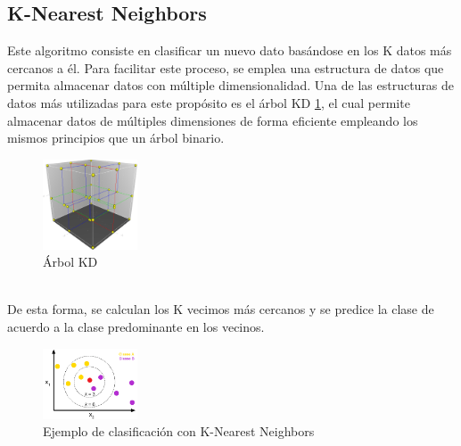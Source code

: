 \documentclass[conference]{IEEEtran}
\begin{document}
\subsection{K-Nearest Neighbors}
Este algoritmo consiste en clasificar un nuevo dato basándose en los K datos más cercanos a él.
Para facilitar este proceso, se emplea una estructura de datos que permita almacenar datos con múltiple dimensionalidad.
Una de las estructuras de datos más utilizadas para este propósito es el árbol KD \ref{fig:kdtree}, el cual permite almacenar datos de múltiples dimensiones de forma eficiente
empleando los mismos principios que un árbol binario.
\begin{figure}[ht]
    \centering
    \includegraphics[width=0.25\textwidth]{images/kdtree.png}
    \caption{Árbol KD}
    \label{fig:kdtree}
\end{figure}
\\
De esta forma, se calculan los K vecimos más cercanos y se predice la clase de acuerdo a la clase predominante en los vecinos.
\begin{figure}[ht]
    \centering
    \includegraphics[width=0.25\textwidth]{images/knn.png}
    \caption{Ejemplo de clasificación con K-Nearest Neighbors}
    \label{fig:knn}
\end{figure}
\end{document}
